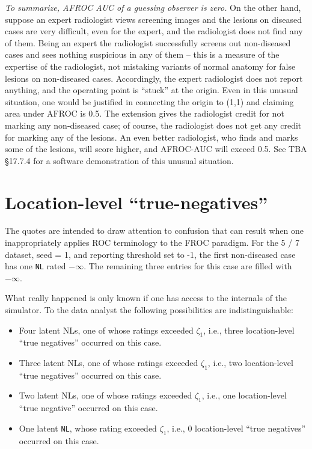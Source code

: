 \documentclass[
]{book}
\providecommand{\tightlist}{%
  \setlength{\itemsep}{0pt}\setlength{\parskip}{0pt}}
\begin{document}
\emph{To summarize, AFROC AUC of a guessing observer is zero.} On the other hand, suppose an expert radiologist views screening images and the lesions on diseased cases are very difficult, even for the expert, and the radiologist does not find any of them. Being an expert the radiologist successfully screens out non-diseased cases and sees nothing suspicious in any of them -- this is a measure of the expertise of the radiologist, not mistaking variants of normal anatomy for false lesions on non-diseased cases. Accordingly, the expert radiologist does not report anything, and the operating point is ``stuck'' at the origin. Even in this unusual situation, one would be justified in connecting the origin to (1,1) and claiming area under AFROC is 0.5. The extension gives the radiologist credit for not marking any non-diseased case; of course, the radiologist does not get any credit for marking any of the lesions. An even better radiologist, who finds and marks some of the lesions, will score higher, and AFROC-AUC will exceed 0.5. See TBA §17.7.4 for a software demonstration of this unusual situation.

\hypertarget{location-level-true-negatives}{%
\section{Location-level ``true-negatives''}\label{location-level-true-negatives}}

The quotes are intended to draw attention to confusion that can result when one inappropriately applies ROC terminology to the FROC paradigm. For the 5 / 7 dataset, seed = 1, and reporting threshold set to -1, the first non-diseased case has one \texttt{NL} rated \ensuremath{-\infty{}}. The remaining three entries for this case are filled with \(-\infty\).

What really happened is only known if one has access to the internals of the simulator. To the data analyst the following possibilities are indistinguishable:

\begin{itemize}
\tightlist
\item
  Four latent NLs, one of whose ratings exceeded \(\zeta_1\), i.e., three location-level ``true negatives'' occurred on this case.
\item
  Three latent NLs, one of whose ratings exceeded \(\zeta_1\), i.e., two location-level ``true negatives'' occurred on this case.
\item
  Two latent NLs, one of whose ratings exceeded \(\zeta_1\), i.e., one location-level ``true negative'' occurred on this case.
\item
  One latent \texttt{NL}, whose rating exceeded \(\zeta_1\), i.e., 0 location-level ``true negatives'' occurred on this case.
\end{itemize}
\end{document}
